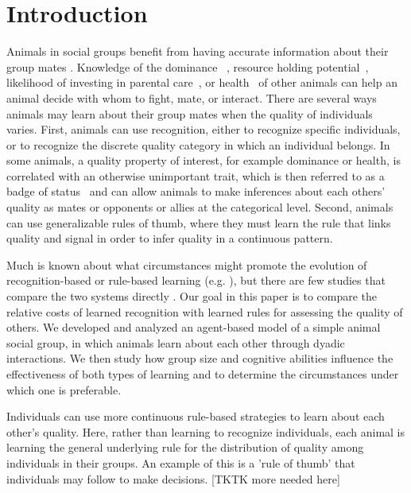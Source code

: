 \section*{Introduction} 
Animals in social groups benefit from having accurate information about their group mates \citep{Seyfarth:2010bh}. Knowledge of the dominance ~\citep{Waal:1986ys,Cowlishaw:1990vn,Bergman:2003qf,Seyfarth:2005ve,Flack:2006uq,Hobson:2015uq}, resource holding potential~\citep{Rhijn:1980uq,Freeman:1985kl,Dick:1990cr,Lemel:1993ve}, likelihood of investing in parental care~\citep{Qvarnstrom:1997fk,Olsen:2010uq}, or health~\citep{Folstad:1992kx,Loyau:2005nx} of other animals can help an animal decide with whom to fight, mate, or interact. There are several ways animals may learn about their group mates when the quality of individuals varies. First, animals can use recognition, either to recognize specific individuals, or to recognize the discrete quality category in which an individual belongs. In some animals, a quality property of interest, for example dominance or health, is correlated with an otherwise unimportant trait, which is then referred to as a badge of status~\citep{dawkins1978signals,Rohwer:1981vn,Rohwer:1982fk} and can allow animals to make inferences about each others' quality as mates or opponents or allies at the categorical level. Second, animals can use generalizable rules of thumb, where they must learn the rule that links quality and signal in order to infer quality in a continuous pattern.  

Much is known about what circumstances might promote the evolution of recognition-based or rule-based learning (e.g. \citep{Whitfield:1987tg,Rohwer:1975fk,Lemel:1993ve,Solberg:1997uq,Tibbetts:2009kx,Remy:2010fk,Sheehan:2014fk}), but there are few studies that compare the two systems directly \citep{sheehan2016evotradeoff}. Our goal in this paper is to compare the relative costs of learned recognition with learned rules for assessing the quality of others. We developed and analyzed an agent-based model of a simple animal social group, in which animals learn about each other through dyadic interactions. We then study how group size and cognitive abilities influence the effectiveness of both types of learning and to determine the circumstances under which one is preferable.  

Individuals can use more continuous rule-based strategies to learn about each other's quality. Here, rather than learning to recognize individuals, each animal is learning the general underlying rule for the distribution of quality among individuals in their groups. An example of this is a 'rule of thumb' that individuals may follow to make decisions. [TKTK more needed here] 

